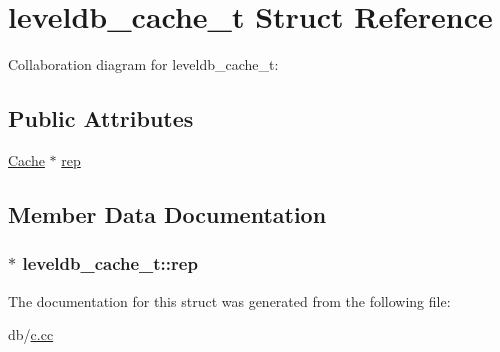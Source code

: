 \hypertarget{structleveldb__cache__t}{\section{leveldb\-\_\-cache\-\_\-t Struct Reference}
\label{structleveldb__cache__t}
}


Collaboration diagram for leveldb\-\_\-cache\-\_\-t\-:
\subsection*{Public Attributes}
\begin{DoxyCompactItemize}
\item 
\hyperlink{classleveldb_1_1_cache}{Cache} $\ast$ \hyperlink{structleveldb__cache__t_a78f74e9a86ea86296e562fe990751a4a}{rep}
\end{DoxyCompactItemize}


\subsection{Member Data Documentation}
\hypertarget{structleveldb__cache__t_a78f74e9a86ea86296e562fe990751a4a}{
\subsubsection[{rep}]{$\ast$ leveldb\-\_\-cache\-\_\-t\-::rep}}\label{structleveldb__cache__t_a78f74e9a86ea86296e562fe990751a4a}


The documentation for this struct was generated from the following file\-:\begin{DoxyCompactItemize}
\item 
db/\hyperlink{c_8cc}{c.\-cc}\end{DoxyCompactItemize}
